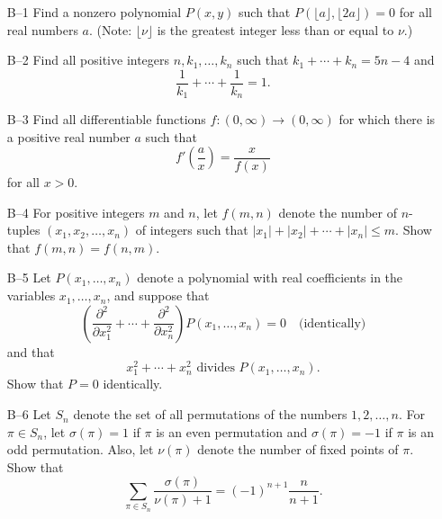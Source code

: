 \documentclass[amssymb,twocolumn,pra,10pt,aps]{revtex4-1}
\begin{document}
\begin{itemize}
\item[B--1]
Find a nonzero polynomial $P(x,y)$ such that $P(\lfloor a \rfloor,
\lfloor 2a \rfloor) = 0$ for all real numbers $a$.
(Note: $\lfloor \nu \rfloor$ is the greatest integer less than
or equal to $\nu$.)

\item[B--2]
Find all positive integers $n, k_1, \dots, k_n$ such that
$k_1 + \cdots + k_n = 5n-4$ and
\[
\frac{1}{k_1} + \cdots + \frac{1}{k_n} = 1.
\]

\item[B--3]
Find all differentiable functions $f: (0, \infty) \to (0, \infty)$ for which
there is a positive real number $a$ such that
\[
f' \left( \frac{a}{x} \right) = \frac{x}{f(x)}
\]
for all $x > 0$.

\item[B--4]
For positive integers $m$ and $n$, let $f(m,n)$ denote the number of
$n$-tuples $(x_1,x_2,\dots,x_n)$ of integers such that
$|x_1| + |x_2| + \cdots + |x_n| \leq m$.
Show that $f(m,n) = f(n,m)$.

\item[B--5]
Let $P(x_1,\dots,x_n)$ denote a polynomial with real coefficients in the
variables $x_1, \dots, x_n$, and suppose that
\[
\left( \frac{\partial^2}{\partial x_1^2} + \cdots + \frac{\partial^2}{\partial
x_n^2}\right) P(x_1, \dots,x_n) = 0 \quad \mbox{(identically)}
\]
and that
\[
x_1^2 + \cdots + x_n^2 \mbox{ divides } P(x_1, \dots, x_n).
\]
Show that $P=0$ identically.

\item[B--6]
Let $S_n$ denote the set of all permutations of the numbers $1,2,\dots,n$.
For $\pi \in S_n$, let $\sigma(\pi) = 1$ if $\pi$ is an even permutation
and $\sigma(\pi) = -1$ if $\pi$ is an odd permutation.
Also, let $\nu(\pi)$ denote the number of fixed points of $\pi$.
Show that
\[
\sum_{\pi \in S_n} \frac{\sigma(\pi)}{\nu(\pi) + 1} = (-1)^{n+1}
\frac{n}{n+1}.
\]
\end{itemize}
\end{document}

